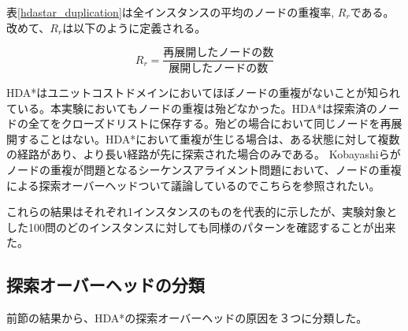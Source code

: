 \documentclass[uplatex]{jsarticle}
\begin{document}
表\ref{hdastar_duplication}は全インスタンスの平均のノードの重複率, $R_{r}$である。改めて、$R_{r}$は以下のように定義される。

\begin{equation}
	R_{r} = \frac{再展開したノードの数}{展開したノードの数}
\end{equation}
\newline

HDA*はユニットコストドメインにおいてほぼノードの重複がないことが知られている\cite{Kishimoto2013}。本実験においてもノードの重複は殆どなかった。HDA*は探索済のノードの全てをクローズドリストに保存する。殆どの場合において同じノードを再展開することはない。HDA*において重複が生じる場合は、ある状態に対して複数の経路があり、より長い経路が先に探索された場合のみである。%
Kobayashiらがノードの重複が問題となるシーケンスアライメント問題において、ノードの重複による探索オーバーヘッドついて議論しているのでこちらを参照されたい\cite{kobayashi2011evaluations}。

これらの結果はそれぞれ1インスタンスのものを代表的に示したが、実験対象とした100問のどのインスタンスに対しても同様のパターンを確認することが出来た。


\subsection{探索オーバーヘッドの分類}

前節の結果から、HDA*の探索オーバーヘッドの原因を３つに分類した。
\end{document}
